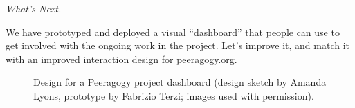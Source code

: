 

\begin{framed}
\noindent 
\emph{What's Next.}
\begin{collectinmacro}{\WrapperWN}{}{}
We have prototyped and deployed a visual ``dashboard'' that people can use to get involved with the ongoing work in the project.  Let's improve it, and match it with an improved interaction design for peeragogy.org.
\end{collectinmacro}
\WrapperWN
\end{framed}    

\begin{figure}
\caption{Design for a Peeragogy project dashboard (design sketch by Amanda Lyons, prototype by Fabrizio Terzi; images used with permission).\label{dashboard}}
\end{figure}

